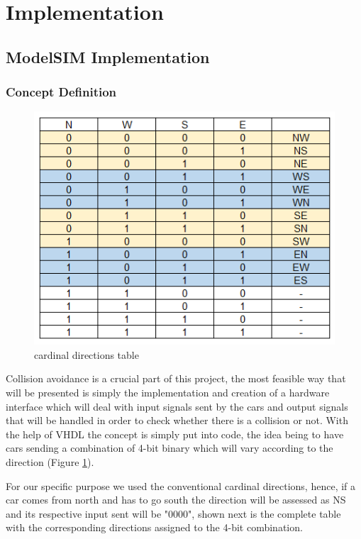 \documentclass[conference]{IEEEtran}
\begin{document}
\section{Implementation}

\subsection{ModelSIM Implementation}

\subsubsection{Concept Definition}

\begin{figure}[h]
    \centerline{\includegraphics[scale=0.5]{directions table.png}}
    \caption{cardinal directions table}
    \label{directions}
\end{figure}

Collision avoidance is a crucial part of this project, the most feasible way that will be presented is simply the implementation and creation of a hardware interface which will deal with input signals sent by the cars and output signals that will be handled in order to check whether there is a collision or not. With the help of VHDL the concept is simply put into code, the idea being to have cars sending a combination of 4-bit binary which will vary according to the direction (Figure \ref{directions}).

For our specific purpose we used the conventional cardinal directions, hence, if a car comes from north and has to go south the direction will be assessed as NS and its respective input sent will be "0000", shown next is the complete table with the corresponding directions assigned to the 4-bit combination.
\end{document}
